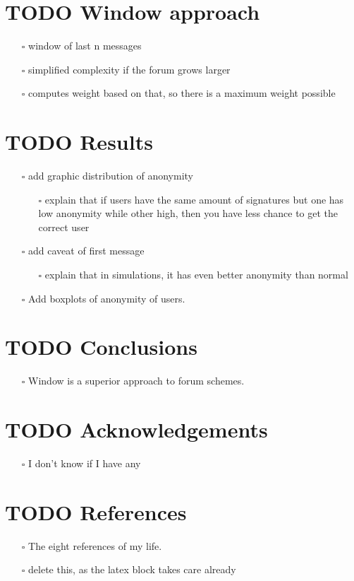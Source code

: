 \documentclass[11pt]{article}
\begin{document}
\section{{\bfseries\sffamily TODO} Window approach}
\label{sec:orgc4c8175}
\begin{itemize}
\item[{$\square$}] window of last n messages
\item[{$\square$}] simplified complexity if the forum grows larger
\item[{$\square$}] computes weight based on that, so there is a maximum weight possible
\end{itemize}
\section{{\bfseries\sffamily TODO} Results}
\label{sec:org83f7a87}
\begin{itemize}
\item[{$\square$}] add graphic distribution of anonymity
\begin{itemize}
\item[{$\square$}] explain that if users have the same amount of signatures but one has
low anonymity while other high, then you have less chance to get the correct user
\end{itemize}
\item[{$\square$}] add caveat of first message
\begin{itemize}
\item[{$\square$}] explain that in simulations, it has even better anonymity than normal
\end{itemize}
\item[{$\square$}] Add boxplots of anonymity of users.
\end{itemize}

\section{{\bfseries\sffamily TODO} Conclusions}
\label{sec:org6b64139}
\begin{itemize}
\item[{$\square$}] Window is a superior approach to forum schemes.
\end{itemize}
\section{{\bfseries\sffamily TODO} Acknowledgements}
\label{sec:orgeb5bfc5}
\begin{itemize}
\item[{$\square$}] I don't know if I have any
\end{itemize}
\section{{\bfseries\sffamily TODO} References}
\label{sec:org11e70d0}
\begin{itemize}
\item[{$\square$}] The eight references of my life.
\item[{$\square$}] delete this, as the latex block takes care already
\end{itemize}




\end{document}
